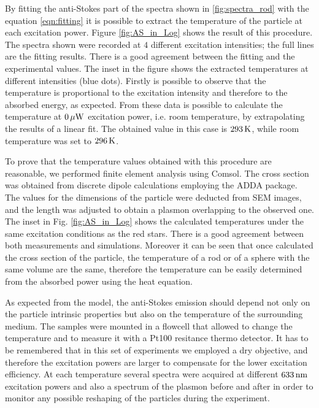 By fitting the anti-Stokes part of the spectra shown in \ref{fig:spectra_rod}
with the equation \ref{eqn:fitting} it is possible to extract the temperature of
the particle at each excitation power. Figure \ref{fig:AS_in_Log} shows the
result of this procedure. The spectra shown were recorded at $4$ different
excitation intensities; the full lines are the fitting results. There is a good
agreement between the fitting and the experimental values. The inset in the
figure shows the extracted temperatures at different intensities (blue dots).
Firstly is possible to observe that the temperature is proportional to the
excitation intensity and therefore to the absorbed energy, as expected. From
these data is possible to calculate the temperature at $0\,\mu\textrm{W}$ excitation
power, i.e. room temperature, by extrapolating the results of a linear fit. The
obtained value in this case is $293\,\textrm{K}$, while room temperature was set to
$296\,\textrm{K}$.

To prove that the temperature values obtained with this procedure are
reasonable, we performed finite element analysis using Comsol. The cross section
was obtained from discrete dipole calculations employing the ADDA
package\cite{Yurkin2011}. The values for the dimensions of the particle were
deducted from SEM images, and the length was adjusted to obtain a plasmon
overlapping to the observed one. The inset in Fig. \ref{fig:AS_in_Log} shows the
calculated temperatures under the same excitation conditions as the red stars.
There is a good agreement between both measurements and simulations. Moreover it
can be seen that once calculated the cross section of the particle, the
temperature of a rod or of a sphere with the same volume are the same, therefore
the temperature can be easily determined from the absorbed power using the heat
equation.

As expected from the model, the anti-Stokes emission should depend not only on
the particle intrinsic properties but also on the temperature of the surrounding
medium\cite{Konrad2013}. The samples were mounted in a flowcell that allowed to
change the temperature and to measure it with a Pt100 resitance thermo detector.
It has to be remembered that in this set of experiments we employed a dry
objective, and therefore the excitation powers are larger to compensate for the
lower excitation efficiency. At each temperature several spectra were acquired
at different $633\,\textrm{nm}$ excitation powers and also a spectrum of the plasmon
before and after in order to monitor any possible reshaping of the particles
during the experiment.

